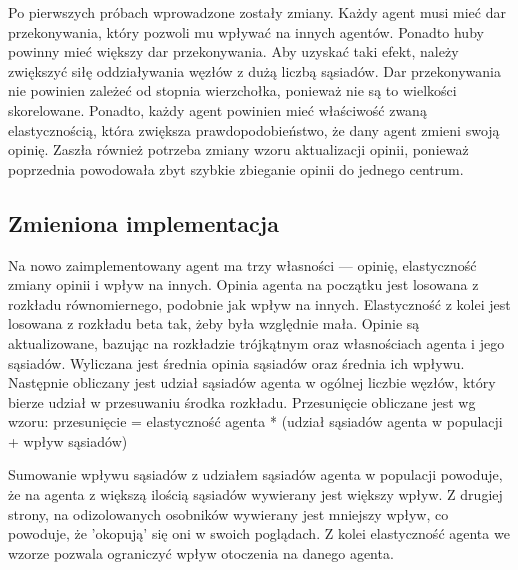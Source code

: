\documentclass{wfiisul}
\begin{document}
Po pierwszych próbach wprowadzone zostały zmiany. Każdy agent musi mieć dar przekonywania, który pozwoli mu wpływać na innych agentów. 
Ponadto huby powinny mieć większy dar przekonywania. Aby uzyskać taki efekt, należy zwiększyć siłę oddziaływania węzłów z dużą liczbą sąsiadów. 
Dar przekonywania nie powinien zależeć od stopnia wierzchołka, ponieważ nie są to wielkości skorelowane. 
Ponadto, każdy agent powinien mieć właściwość zwaną elastycznością, która zwiększa prawdopodobieństwo, że dany agent zmieni swoją opinię. 
Zaszła również potrzeba zmiany wzoru aktualizacji opinii, ponieważ poprzednia powodowała zbyt szybkie zbieganie opinii do jednego centrum. 

\subsection{Zmieniona implementacja}

Na nowo zaimplementowany agent ma trzy własności — opinię, elastyczność zmiany opinii i wpływ na innych. 
Opinia agenta na początku jest losowana z rozkładu równomiernego, podobnie jak wpływ na innych. 
Elastyczność z kolei jest losowana z rozkładu beta tak, żeby była względnie mała. 
Opinie są aktualizowane, bazując na rozkładzie trójkątnym oraz własnościach agenta i jego sąsiadów. 
Wyliczana jest średnia opinia sąsiadów oraz średnia ich wpływu. 
Następnie obliczany jest udział sąsiadów agenta w ogólnej liczbie węzłów, który bierze udział w przesuwaniu środka rozkładu. 
Przesunięcie obliczane jest wg wzoru: 
przesunięcie = elastyczność agenta * (udział sąsiadów agenta w populacji + wpływ sąsiadów) 

Sumowanie wpływu sąsiadów z udziałem sąsiadów agenta w populacji powoduje, że na agenta z większą ilością sąsiadów wywierany jest większy wpływ. 
Z drugiej strony, na odizolowanych osobników wywierany jest mniejszy wpływ, co powoduje, że 'okopują' się oni w swoich poglądach. 
Z kolei elastyczność agenta we wzorze pozwala ograniczyć wpływ otoczenia na danego agenta. 
 
\end{document}
